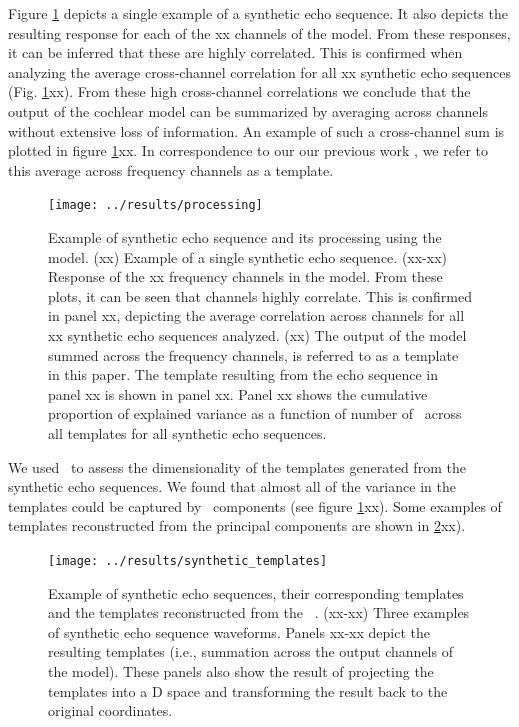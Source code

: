 \documentclass[preprint,5p]{elsarticle}
\begin{document}
Figure \ref{fig:processing} depicts a single example of a synthetic echo sequence. It also depicts the resulting response for each of the xx channels of the \citet{Wiegrebe2008} model. From these responses, it can be inferred that these are highly correlated. This is confirmed when analyzing the average cross-channel correlation for all xx synthetic echo sequences (Fig. \ref{fig:processing}xx). From these high cross-channel correlations we conclude that the output of the cochlear model can be summarized by averaging across channels without extensive loss of information. An example of such a cross-channel sum is plotted in figure \ref{fig:processing}xx. In correspondence to our our previous work \citep{Vanderelst2016}, we refer to this average across frequency channels as a template.

\begin{figure}[tb]
	\centering
	\texttt{[image: ../results/processing]}
	\caption{Example of synthetic echo sequence and its processing using the \citet{Wiegrebe2008} model. (xx) Example of a single synthetic echo sequence. (xx-xx) Response of the xx frequency channels in the \citet{Wiegrebe2008} model. From these plots, it can be seen that channels highly correlate. This is confirmed in panel xx, depicting the average correlation across channels for all xx synthetic echo sequences analyzed. (xx) The output of the \citet{Wiegrebe2008} model summed across the frequency channels, is referred to as a template in this paper. The template resulting from the echo sequence in panel xx is shown in panel xx. Panel xx shows the cumulative proportion of explained variance as a function of number of \pc\ across all templates for all synthetic echo sequences.}
	\label{fig:processing}
\end{figure}

We used \PCA\ to assess the dimensionality of the  templates generated from the synthetic echo sequences. We found that almost all of the variance in the templates could be captured by \pca\ components (see figure \ref{fig:processing}xx). Some examples of templates reconstructed from the principal components are shown in \ref{fig:synthetictemplates}xx).

\begin{figure}[tb]
	\centering
	\texttt{[image: ../results/synthetic\_templates]}
	\caption{Example of synthetic echo sequences, their corresponding templates and the templates reconstructed from the \pca\ \pcs. (xx-xx) Three examples of synthetic echo sequence waveforms. Panels xx-xx depict the resulting templates (i.e., summation across the output channels of the \citet{Wiegrebe2008} model). These panels also show the result of projecting the templates into a \pca D space and transforming the result back to the original coordinates.}
	\label{fig:synthetictemplates}
\end{figure}
\end{document}
